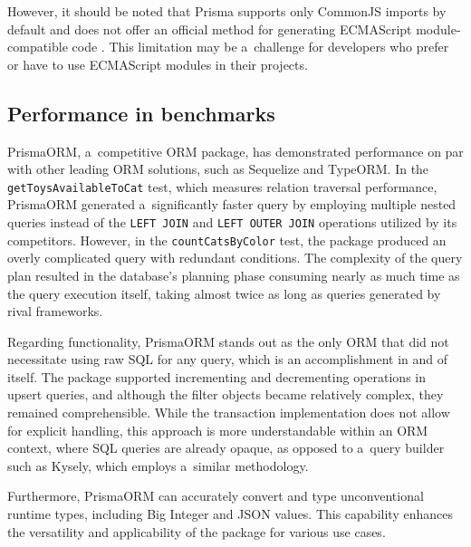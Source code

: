 However, it should be noted that Prisma supports only CommonJS imports by
default and does not offer an official method for generating ECMAScript
module-compatible code \cite{prismaES6}. This limitation may be a~challenge for
developers who prefer or have to use ECMAScript modules in their projects.

\subsection*{Performance in benchmarks}

PrismaORM, a~competitive ORM package, has demonstrated performance on par with
other leading ORM solutions, such as Sequelize and TypeORM. In the
\texttt{getToysAvailableToCat} test, which measures relation traversal
performance, PrismaORM generated a~significantly faster query by employing
multiple nested queries instead of the \texttt{LEFT JOIN} and \texttt{LEFT OUTER
JOIN} operations utilized by its competitors. However, in the
\texttt{countCatsByColor} test, the package produced an overly complicated query
with redundant conditions. The complexity of the query plan resulted in the
database's planning phase consuming nearly as much time as the query execution
itself, taking almost twice as long as queries generated by rival frameworks.

Regarding functionality, PrismaORM stands out as the only ORM that did not
necessitate using raw SQL for any query, which is an accomplishment in and of
itself. The package supported incrementing and decrementing operations in upsert
queries, and although the filter objects became relatively complex, they
remained comprehensible. While the transaction implementation does not allow for
explicit handling, this approach is more understandable within an ORM context,
where SQL queries are already opaque, as opposed to a~query builder such as
Kysely, which employs a~similar methodology.

Furthermore, PrismaORM can accurately convert and type unconventional runtime
types, including Big Integer and JSON values. This capability enhances the
versatility and applicability of the package for various use cases.
